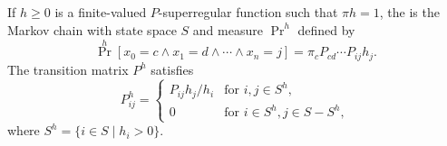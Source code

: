 If $h \geq 0$ is a finite-valued $P$-superregular function such that $\pi h = 1$, the  is the Markov chain with state space $S$ and measure $\Pr^h$ defined by
$$\Pr^h[x_0 = c \land x_1 = d \land \cdots \land x_n = j] = \pi_c P_{cd} \cdots P_{ij} h_j.$$
The transition matrix $P^h$ satisfies
$$P_{ij}^h = \begin{cases} P_{ij} h_j / h_i & \text{for } i, j \in S^h, \\ 0 & \text{for } i \in S^h, j \in S - S^h, \end{cases}$$
where $S^h = \{i \in S \mid h_i > 0\}$.
